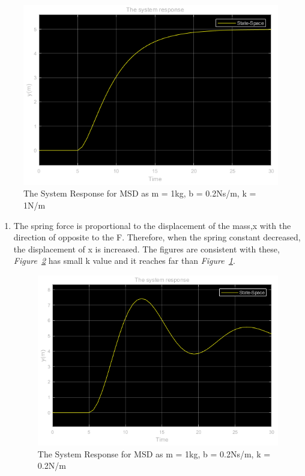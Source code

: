 \documentclass[a4paper,12pt]{article}
\begin{document}
\begin{enumerate}
\begin{enumerate}
				\begin{figure}[h]
					\center
					\setlength{\unitlength}{\textwidth} 
					\includegraphics[width=0.8\unitlength]{images/1cy}
					\caption{\label{fig:1c} The System Response for MSD as m = 1kg, b = 0.2Ns/m, k = 1N/m }
				\end{figure}
			
				\begin{enumerate}
					\item The spring force is proportional to the displacement of the mass,x with the direction of opposite to the F. Therefore, when the spring constant decreased, the displacement of x is increased. The figures are consistent with these, \textit{Figure~\ref{fig:1c1}} has small k value and it reaches far than \textit{Figure~\ref{fig:1c}}.		
			
			\begin{figure}[h]
				\center
				\setlength{\unitlength}{\textwidth} 
				\includegraphics[width=0.8\unitlength]{images/1c1y}
				\caption{\label{fig:1c1} The System Response for MSD as m = 1kg, b = 0.2Ns/m, k = 0.2N/m }
			\end{figure}
			

\end{enumerate}
\end{enumerate}
\end{enumerate}
\end{document}
